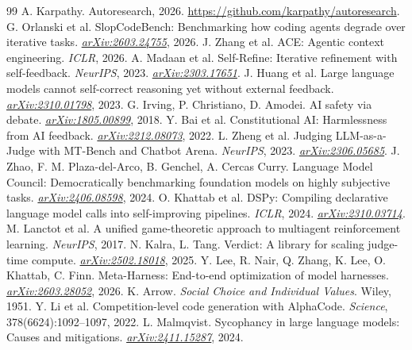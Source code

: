 \documentclass[11pt]{article}
\begin{document}
\clearpage
\begin{thebibliography}{99}
\small
{} A. Karpathy. Autoresearch, 2026. \url{https://github.com/karpathy/autoresearch}.
 G. Orlanski et al. SlopCodeBench: Benchmarking how coding agents degrade over iterative tasks. \textit{\href{https://arxiv.org/abs/2603.24755}{arXiv:2603.24755}}, 2026.
 J. Zhang et al. ACE: Agentic context engineering. \textit{ICLR}, 2026.
 A. Madaan et al. Self-Refine: Iterative refinement with self-feedback. \textit{NeurIPS}, 2023. \textit{\href{https://arxiv.org/abs/2303.17651}{arXiv:2303.17651}}.
 J. Huang et al. Large language models cannot self-correct reasoning yet without external feedback. \textit{\href{https://arxiv.org/abs/2310.01798}{arXiv:2310.01798}}, 2023.
 G. Irving, P. Christiano, D. Amodei. AI safety via debate. \textit{\href{https://arxiv.org/abs/1805.00899}{arXiv:1805.00899}}, 2018.
 Y. Bai et al. Constitutional AI: Harmlessness from AI feedback. \textit{\href{https://arxiv.org/abs/2212.08073}{arXiv:2212.08073}}, 2022.
 L. Zheng et al. Judging LLM-as-a-Judge with MT-Bench and Chatbot Arena. \textit{NeurIPS}, 2023. \textit{\href{https://arxiv.org/abs/2306.05685}{arXiv:2306.05685}}.
 J. Zhao, F. M. Plaza-del-Arco, B. Genchel, A. Cercas Curry. Language Model Council: Democratically benchmarking foundation models on highly subjective tasks. \textit{\href{https://arxiv.org/abs/2406.08598}{arXiv:2406.08598}}, 2024.
 O. Khattab et al. DSPy: Compiling declarative language model calls into self-improving pipelines. \textit{ICLR}, 2024. \textit{\href{https://arxiv.org/abs/2310.03714}{arXiv:2310.03714}}.
 M. Lanctot et al. A unified game-theoretic approach to multiagent reinforcement learning. \textit{NeurIPS}, 2017.
 N. Kalra, L. Tang. Verdict: A library for scaling judge-time compute. \textit{\href{https://arxiv.org/abs/2502.18018}{arXiv:2502.18018}}, 2025.
 Y. Lee, R. Nair, Q. Zhang, K. Lee, O. Khattab, C. Finn. Meta-Harness: End-to-end optimization of model harnesses. \textit{\href{https://arxiv.org/abs/2603.28052}{arXiv:2603.28052}}, 2026.
 K. Arrow. \textit{Social Choice and Individual Values}. Wiley, 1951.
 Y. Li et al. Competition-level code generation with AlphaCode. \textit{Science}, 378(6624):1092--1097, 2022.
 L. Malmqvist. Sycophancy in large language models: Causes and mitigations. \textit{\href{https://arxiv.org/abs/2411.15287}{arXiv:2411.15287}}, 2024.

\end{thebibliography}
\end{document}
